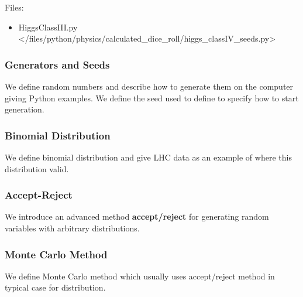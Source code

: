 
Files:

\begin{itemize}
\tightlist
\item
  HiggsClassIII.py \textless{}/files/python/physics/calculated\_dice\_roll/higgs\_classIV\_seeds.py\textgreater{}
\end{itemize}

\subsubsection{Generators and Seeds}\label{generators-and-seeds}

We define random numbers and describe how to generate them on the
computer giving Python examples. We define the seed used to define to
specify how to start generation.



\subsubsection{Binomial Distribution}\label{binomial-distribution}

We define binomial distribution and give LHC data as an example of where
this distribution valid.


\subsubsection{Accept-Reject}\label{accept-reject}

We introduce an advanced method \textbf{accept/reject} for generating
random variables with arbitrary distributions.


\subsubsection{Monte Carlo Method}\label{monte-carlo-method}

We define Monte Carlo method which usually uses accept/reject method in
typical case for distribution.

